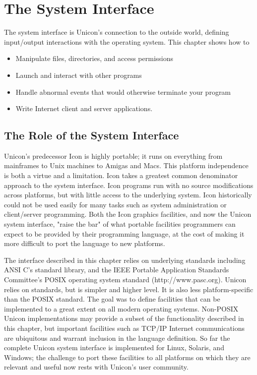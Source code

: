 \chapter{The System Interface}

The system interface is Unicon's connection to the
outside world, defining input/output interactions
with the operating system. This chapter shows how to
\begin{itemize}\itemsep0pt
  \item Manipulate files, directories, and
    access permissions
  \item Launch and interact with other programs
  \item Handle abnormal events that would otherwise terminate your program
  \item Write Internet client and
    server applications.
\end{itemize}

\section{The Role of the System Interface}

Unicon's predecessor Icon is highly portable; it runs on everything
from mainframes to Unix machines to Amigas and Macs. This platform
independence is both a virtue and a limitation. Icon takes a greatest
common denominator approach to the system interface. Icon programs run
with no source modifications across platforms, but with little access
to the underlying system. Icon historically could not be used easily
for many tasks such as system administration or client/server
programming. Both the Icon graphics facilities, and now the Unicon
system interface, "raise the bar" of what portable facilities
programmers can expect to be provided by their programming language,
at the cost of making it more difficult to port the language to new
platforms.

The interface described in this chapter relies on underlying standards
including ANSI C's standard library, and the IEEE Portable Application
Standards Committee's POSIX operating system standard
(http://www.pasc.org). Unicon relies on standards, but is simpler and
higher level. It is also less platform-specific than the POSIX
standard. The goal was to define facilities that can be implemented to
a great extent on all modern operating systems.  Non-POSIX Unicon
implementations may provide a subset of the functionality described in
this chapter, but important facilities such as TCP/IP Internet
communications are ubiquitous and warrant inclusion in the language
definition. So far the complete Unicon system interface is implemented
for Linux, Solaris, and Windows; the challenge to port these
facilities to all platforms on which they are relevant and useful now
rests with Unicon's user community.

